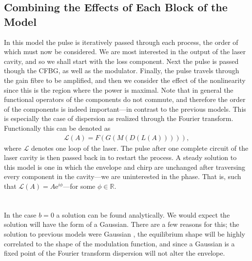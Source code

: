 \documentclass[10pt,twocolumn,a4paper]{article}
\begin{document}
\subsection{Combining the Effects of Each Block of the Model}
\label{sec:effects}
In this model the pulse is iteratively passed through each process, the order of which must now be considered. We are most interested in the output of the laser cavity, and so we shall start with the loss component. Next the pulse is passed though the CFBG, as well as the modulator. Finally, the pulse travels through the gain fibre to be amplified, and then we consider the effect of the nonlinearity since this is the region where the power is maximal. Note that in general the functional operators of the components do not commute, and therefore the order of the components is indeed important---in contrast to the previous models. This is especially the case of dispersion as realized through the Fourier transform. Functionally this can be denoted as
\begin{align}
\mathcal{L}(A) = F(G(M(D(L(A))))),
\end{align}
where $\mathcal{L}$ denotes one loop of the laser. The pulse after one complete circuit of the laser cavity is then passed back in to restart the process. A steady solution to this model is one in which the envelope and chirp are unchanged after traversing every component in the cavity---we are uninterested in the phase. That is, such that $\mathcal{L}(A) = A \textrm{e}^{i \phi}$---for some $\phi \in \mathbb{R}$. \\



\section{}
In the case $b = 0$ a solution can be found analytically. We would expect the solution will have the form of a Gaussian. There are a few reasons for this; the solution to previous models were Gaussian \cite{cutler, siegman, kuizenga1970a, martinez1984, martinez1985}, the equilibrium shape will be highly correlated to the shape of the modulation function, and since a Gaussian is a fixed point of the Fourier transform \cite{gradshteyn} dispersion will not alter the envelope.
\end{document}

